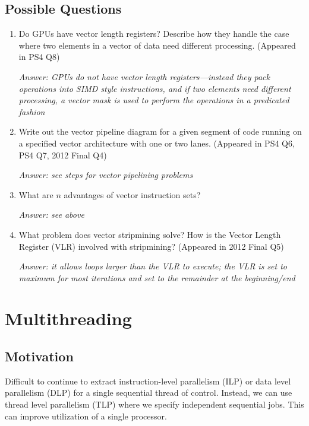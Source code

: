 \documentclass{article}
\begin{document}
\subsection{Possible Questions}

\begin{enumerate}

\item Do GPUs have vector length registers? Describe how they handle the case where two elements in a vector of data need different processing. (Appeared in PS4 Q8)

\textit{Answer: GPUs do not have vector length registers---instead they pack operations into SIMD style instructions, and if two elements need different processing, a vector mask is used to perform the operations in a predicated fashion}

\item Write out the vector pipeline diagram for a given segment of code running on a specified vector architecture with one or two lanes. (Appeared in PS4 Q6, PS4 Q7, 2012 Final Q4)

\textit{Answer: see steps for vector pipelining problems}

\item What are $n$ advantages of vector instruction sets?

\textit{Answer: see above}

\item What problem does vector stripmining solve? How is the Vector Length Register (VLR) involved with stripmining? (Appeared in 2012 Final Q5)

\textit{Answer: it allows loops larger than the VLR to execute; the VLR is set to maximum for most iterations and set to the remainder at the beginning/end}

\end{enumerate}

\section{Multithreading}

\subsection{Motivation}

Difficult to continue to extract instruction-level parallelism (ILP) or data level parallelism (DLP) for a single sequential thread of control. Instead, we can use thread level parallelism (TLP) where we specify independent sequential jobs. This can improve utilization of a single processor.
\end{document}
